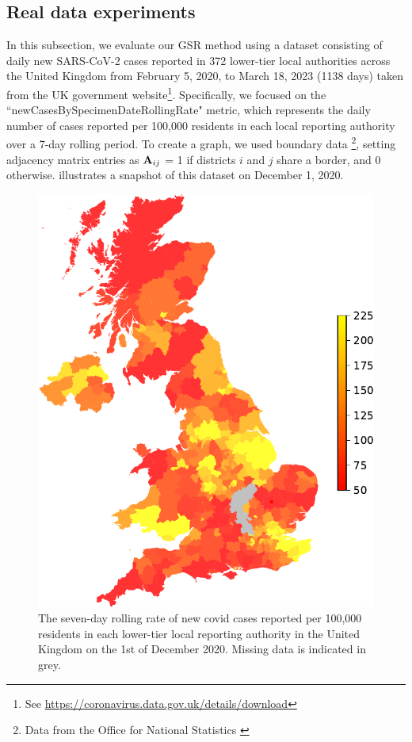 \subsection{Real data experiments}

In this subsection, we evaluate our GSR method using a dataset consisting of daily new SARS-CoV-2 cases reported in 372 lower-tier local authorities across the United Kingdom from February 5, 2020, to March 18, 2023 (1138 days) taken from the UK government website\footnote{See \url{https://coronavirus.data.gov.uk/details/download}}. Specifically, we focused on the ``newCasesBySpecimenDateRollingRate" metric, which represents the daily number of cases reported per 100,000 residents in each local reporting authority over a 7-day rolling period. To create a graph, we used boundary data \footnote{Data from the Office for National Statistics \citep{ONS2019}}, setting adjacency matrix entries as $\mathbf{A}_{ij}$ = 1 if districts $i$ and $j$ share a border, and 0 otherwise.  illustrates a snapshot of this dataset on December 1, 2020.


\begin{figure}[b]
    \begin{center}
        \includegraphics[width=0.6\linewidth]{Figures/UK_covid.pdf}
    \end{center}
    \caption[Snapshot of the Covid-19 case rate in the UK]{\small{The seven-day rolling rate of new covid cases reported per 100,000 residents in each lower-tier local reporting authority in the United Kingdom on the 1st of December 2020. Missing data is indicated in grey.}}
    \label{fig:covid}
\end{figure}


